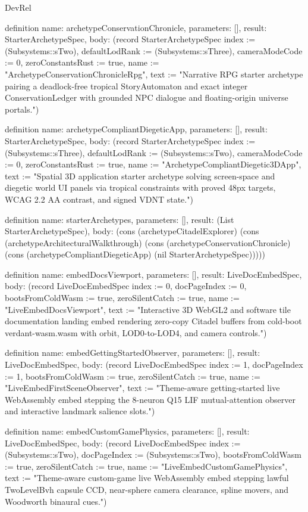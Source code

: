 \begin{lexlean}{DevRel}
\begin{semanticmodule}
definition{
  name: archetypeConservationChronicle,
  parameters: [],
  result: StarterArchetypeSpec,
  body: (record StarterArchetypeSpec {index := (Subsystems::sTwo), defaultLodRank := (Subsystems::sThree), cameraModeCode := 0, zeroConstantsRust := true, name := "ArchetypeConservationChronicleRpg", text := "Narrative RPG starter archetype pairing a deadlock-free tropical StoryAutomaton and exact integer ConservationLedger with grounded NPC dialogue and floating-origin universe portals."})
}

definition{
  name: archetypeCompliantDiegeticApp,
  parameters: [],
  result: StarterArchetypeSpec,
  body: (record StarterArchetypeSpec {index := (Subsystems::sThree), defaultLodRank := (Subsystems::sTwo), cameraModeCode := 0, zeroConstantsRust := true, name := "ArchetypeCompliantDiegetic3DApp", text := "Spatial 3D application starter archetype solving screen-space and diegetic world UI panels via tropical constraints with proved 48px targets, WCAG 2.2 AA contrast, and signed VDNT state."})
}

definition{
  name: starterArchetypes,
  parameters: [],
  result: (List StarterArchetypeSpec),
  body: (cons (archetypeCitadelExplorer) (cons (archetypeArchitecturalWalkthrough) (cons (archetypeConservationChronicle) (cons (archetypeCompliantDiegeticApp) (nil StarterArchetypeSpec)))))
}

definition{
  name: embedDocsViewport,
  parameters: [],
  result: LiveDocEmbedSpec,
  body: (record LiveDocEmbedSpec {index := 0, docPageIndex := 0, bootsFromColdWasm := true, zeroSilentCatch := true, name := "LiveEmbedDocsViewport", text := "Interactive 3D WebGL2 and software tile documentation landing embed rendering zero-copy Citadel buffers from cold-boot verdant-wasm.wasm with orbit, LOD0-to-LOD4, and camera controls."})
}

definition{
  name: embedGettingStartedObserver,
  parameters: [],
  result: LiveDocEmbedSpec,
  body: (record LiveDocEmbedSpec {index := 1, docPageIndex := 1, bootsFromColdWasm := true, zeroSilentCatch := true, name := "LiveEmbedFirstSceneObserver", text := "Theme-aware getting-started live WebAssembly embed stepping the 8-neuron Q15 LIF mutual-attention observer and interactive landmark salience slots."})
}

definition{
  name: embedCustomGamePhysics,
  parameters: [],
  result: LiveDocEmbedSpec,
  body: (record LiveDocEmbedSpec {index := (Subsystems::sTwo), docPageIndex := (Subsystems::sTwo), bootsFromColdWasm := true, zeroSilentCatch := true, name := "LiveEmbedCustomGamePhysics", text := "Theme-aware custom-game live WebAssembly embed stepping lawful TwoLevelBvh capsule CCD, near-sphere camera clearance, spline movers, and Woodworth binaural cues."})
}


\end{semanticmodule}
\end{lexlean}
